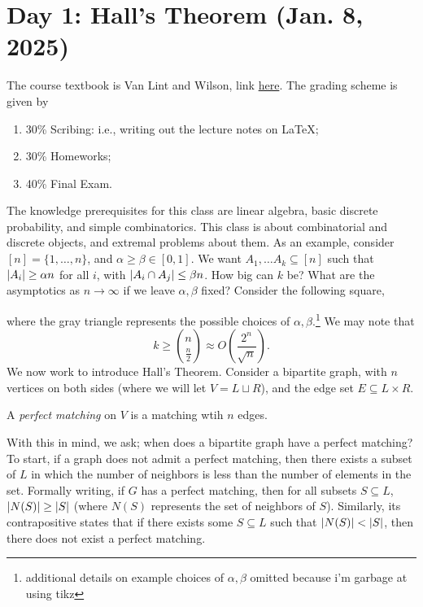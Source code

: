\section{Day 1: Hall's Theorem (Jan. 8, 2025)}
The course textbook is Van Lint and Wilson, link \href{https://mathematicalolympiads.wordpress.com/wp-content/uploads/2012/08/a_course_in_combinatorics.pdf}{here}. The grading scheme is given by
\begin{enumerate}[label=(\roman*)]
    \item 30\% Scribing: i.e., writing out the lecture notes on LaTeX;
    \item 30\% Homeworks;
    \item 40\% Final Exam.
\end{enumerate}
The knowledge prerequisites for this class are linear algebra, basic discrete probability, and simple combinatorics. This class is about combinatorial and discrete objects, and extremal problems about them.
\medskip\newline
As an example, consider $[n] = \{1, \dots, n\}$, and $\alpha \geq \beta \in [0, 1]$. We want $A_1, \dots A_k \subseteq [n]$ such that $\left\lvert A_i \right\rvert \geq \alpha n$ for all $i$, with $\left\lvert A_i \cap A_j \right\rvert \leq \beta n$. How big can $k$ be? What are the asymptotics as $n \to \infty$ if we leave $\alpha, \beta$ fixed? Consider the following square,
\begin{figure}[h] \centering {} \end{figure}
where the gray triangle represents the possible choices of $\alpha, \beta$.\footnote{additional details on example choices of $\alpha, \beta$ omitted because i'm garbage at using tikz} We may note that
\[ k \geq \binom{n}{\frac{n}{2}} \approx O\left( \frac{2^n}{\sqrt{n}} \right). \]
We now work to introduce Hall's Theorem. Consider a bipartite graph, with $n$ vertices on both sides (where we will let $V = L \sqcup R$), and the edge set $E \subseteq L \times R$.
\begin{definition}
    A \textit{perfect matching} on $V$ is a matching wtih $n$ edges.
\end{definition}
\noindent With this in mind, we ask; when does a bipartite graph have a perfect matching? To start, if a graph does not admit a perfect matching, then there exists a subset of $L$ in which the number of neighbors is less than the number of elements in the set. Formally writing, if $G$ has a perfect matching, then for all subsets $S \subseteq L$, $\left\lvert N(S) \right\rvert \geq \left\lvert S \right\rvert$ (where $N(S)$ represents the set of neighbors of $S$). Similarly, its contrapositive states that if there exists some $S \subseteq L$ such that $\left\lvert N(S) \right\rvert < \left\lvert S \right\rvert$, then there does not exist a perfect matching.
